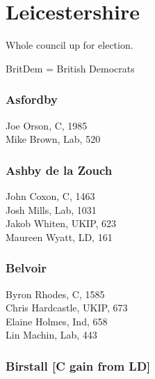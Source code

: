 \documentclass[a4paper,openany,10pt]{book}
\begin{document}
\section{Leicestershire}

Whole council up for election.

BritDem = British Democrats



\subsubsection*{Asfordby}



Joe Orson, C, 1985\\
Mike Brown, Lab, 520\\


\subsubsection*{Ashby de la Zouch}



John Coxon, C, 1463\\
Josh Mills, Lab, 1031\\
Jakob Whiten, UKIP, 623\\
Maureen Wyatt, LD, 161\\


\subsubsection*{Belvoir}



Byron Rhodes, C, 1585\\
Chris Hardcastle, UKIP, 673\\
Elaine Holmes, Ind, 658\\
Lin Machin, Lab, 443\\


\subsubsection*{Birstall \hspace*{\fill}\nolinebreak[1]%
\enspace\hspace*{\fill}
[C gain from LD]}

\end{document}
